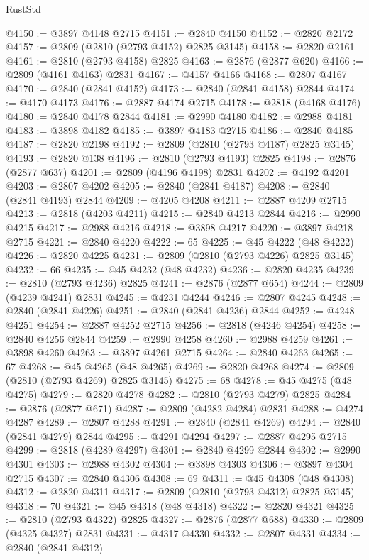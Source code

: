 \begin{lexlean}{RustStd}
\begin{coremodule}
{\begin{coremodule}
{{{{{{{{{{{{{{{{{{{{{{{{{{{{{{{{{@4150 := @3897 @4148 @2715
@4151 := @2840 @4150
@4152 := @2820 @2172
@4157 := @2809 (@2810 (@2793 @4152) @2825 @3145)
@4158 := @2820 @2161
@4161 := @2810 (@2793 @4158) @2825
@4163 := @2876 (@2877 @620)
@4166 := @2809 (@4161 @4163) @2831
@4167 := @4157 @4166
@4168 := @2807 @4167
@4170 := @2840 (@2841 @4152)
@4173 := @2840 (@2841 @4158) @2844
@4174 := @4170 @4173
@4176 := @2887 @4174 @2715
@4178 := @2818 (@4168 @4176)
@4180 := @2840 @4178 @2844
@4181 := @2990 @4180
@4182 := @2988 @4181
@4183 := @3898 @4182
@4185 := @3897 @4183 @2715
@4186 := @2840 @4185
@4187 := @2820 @2198
@4192 := @2809 (@2810 (@2793 @4187) @2825 @3145)
@4193 := @2820 @138
@4196 := @2810 (@2793 @4193) @2825
@4198 := @2876 (@2877 @637)
@4201 := @2809 (@4196 @4198) @2831
@4202 := @4192 @4201
@4203 := @2807 @4202
@4205 := @2840 (@2841 @4187)
@4208 := @2840 (@2841 @4193) @2844
@4209 := @4205 @4208
@4211 := @2887 @4209 @2715
@4213 := @2818 (@4203 @4211)
@4215 := @2840 @4213 @2844
@4216 := @2990 @4215
@4217 := @2988 @4216
@4218 := @3898 @4217
@4220 := @3897 @4218 @2715
@4221 := @2840 @4220
@4222 := 65
@4225 := @45 @4222 (@48 @4222)
@4226 := @2820 @4225
@4231 := @2809 (@2810 (@2793 @4226) @2825 @3145)
@4232 := 66
@4235 := @45 @4232 (@48 @4232)
@4236 := @2820 @4235
@4239 := @2810 (@2793 @4236) @2825
@4241 := @2876 (@2877 @654)
@4244 := @2809 (@4239 @4241) @2831
@4245 := @4231 @4244
@4246 := @2807 @4245
@4248 := @2840 (@2841 @4226)
@4251 := @2840 (@2841 @4236) @2844
@4252 := @4248 @4251
@4254 := @2887 @4252 @2715
@4256 := @2818 (@4246 @4254)
@4258 := @2840 @4256 @2844
@4259 := @2990 @4258
@4260 := @2988 @4259
@4261 := @3898 @4260
@4263 := @3897 @4261 @2715
@4264 := @2840 @4263
@4265 := 67
@4268 := @45 @4265 (@48 @4265)
@4269 := @2820 @4268
@4274 := @2809 (@2810 (@2793 @4269) @2825 @3145)
@4275 := 68
@4278 := @45 @4275 (@48 @4275)
@4279 := @2820 @4278
@4282 := @2810 (@2793 @4279) @2825
@4284 := @2876 (@2877 @671)
@4287 := @2809 (@4282 @4284) @2831
@4288 := @4274 @4287
@4289 := @2807 @4288
@4291 := @2840 (@2841 @4269)
@4294 := @2840 (@2841 @4279) @2844
@4295 := @4291 @4294
@4297 := @2887 @4295 @2715
@4299 := @2818 (@4289 @4297)
@4301 := @2840 @4299 @2844
@4302 := @2990 @4301
@4303 := @2988 @4302
@4304 := @3898 @4303
@4306 := @3897 @4304 @2715
@4307 := @2840 @4306
@4308 := 69
@4311 := @45 @4308 (@48 @4308)
@4312 := @2820 @4311
@4317 := @2809 (@2810 (@2793 @4312) @2825 @3145)
@4318 := 70
@4321 := @45 @4318 (@48 @4318)
@4322 := @2820 @4321
@4325 := @2810 (@2793 @4322) @2825
@4327 := @2876 (@2877 @688)
@4330 := @2809 (@4325 @4327) @2831
@4331 := @4317 @4330
@4332 := @2807 @4331
@4334 := @2840 (@2841 @4312)
}}}}}}}}}}}}}}}}}}}}}}}}}}}}}}}}}
\end{coremodule}}
\end{coremodule}
\end{lexlean}

